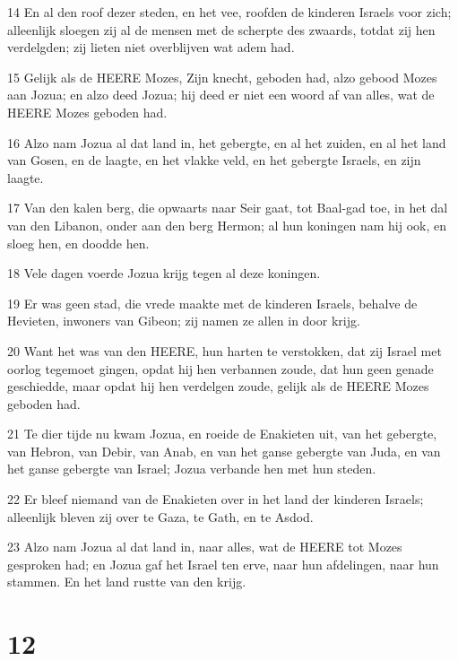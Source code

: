 \par 14 En al den roof dezer steden, en het vee, roofden de kinderen Israels voor zich; alleenlijk sloegen zij al de mensen met de scherpte des zwaards, totdat zij hen verdelgden; zij lieten niet overblijven wat adem had.
\par 15 Gelijk als de HEERE Mozes, Zijn knecht, geboden had, alzo gebood Mozes aan Jozua; en alzo deed Jozua; hij deed er niet een woord af van alles, wat de HEERE Mozes geboden had.
\par 16 Alzo nam Jozua al dat land in, het gebergte, en al het zuiden, en al het land van Gosen, en de laagte, en het vlakke veld, en het gebergte Israels, en zijn laagte.
\par 17 Van den kalen berg, die opwaarts naar Seir gaat, tot Baal-gad toe, in het dal van den Libanon, onder aan den berg Hermon; al hun koningen nam hij ook, en sloeg hen, en doodde hen.
\par 18 Vele dagen voerde Jozua krijg tegen al deze koningen.
\par 19 Er was geen stad, die vrede maakte met de kinderen Israels, behalve de Hevieten, inwoners van Gibeon; zij namen ze allen in door krijg.
\par 20 Want het was van den HEERE, hun harten te verstokken, dat zij Israel met oorlog tegemoet gingen, opdat hij hen verbannen zoude, dat hun geen genade geschiedde, maar opdat hij hen verdelgen zoude, gelijk als de HEERE Mozes geboden had.
\par 21 Te dier tijde nu kwam Jozua, en roeide de Enakieten uit, van het gebergte, van Hebron, van Debir, van Anab, en van het ganse gebergte van Juda, en van het ganse gebergte van Israel; Jozua verbande hen met hun steden.
\par 22 Er bleef niemand van de Enakieten over in het land der kinderen Israels; alleenlijk bleven zij over te Gaza, te Gath, en te Asdod.
\par 23 Alzo nam Jozua al dat land in, naar alles, wat de HEERE tot Mozes gesproken had; en Jozua gaf het Israel ten erve, naar hun afdelingen, naar hun stammen. En het land rustte van den krijg.

\chapter{12}

